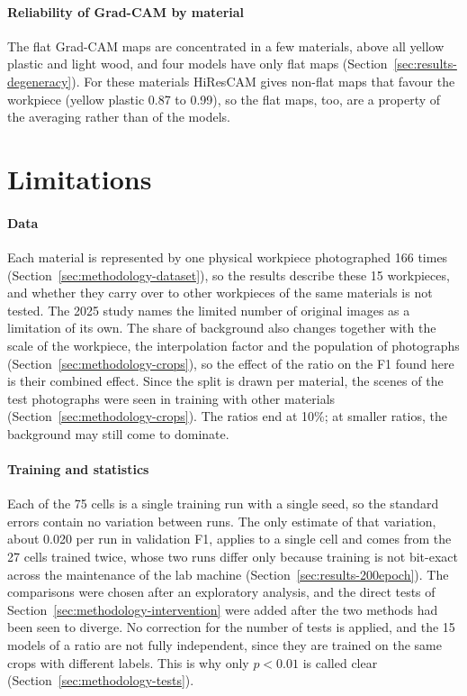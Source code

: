 \paragraph{Reliability of Grad-CAM by material}
The flat Grad-CAM maps are concentrated in a few materials, above all yellow plastic and
light wood, and four models have only flat maps (Section~\ref{sec:results-degeneracy}).
For these materials HiResCAM gives non-flat maps that favour the workpiece (yellow plastic
0.87 to 0.99), so the flat maps, too, are a property of the averaging rather than of the
models.

\section{Limitations}
\label{sec:discussion-limitations}

\paragraph{Data}
Each material is represented by one physical workpiece photographed 166 times
(Section~\ref{sec:methodology-dataset}), so the results describe these 15 workpieces,
and whether they carry over to other workpieces of the same materials is not tested.
The 2025 study names the limited number of original images as a limitation of its own.
The share of background also changes together with the scale of the workpiece, the
interpolation factor and the population of photographs (Section~\ref{sec:methodology-crops}), so the effect of the ratio
on the F1 found here is their combined effect. Since the split is drawn per material, the
scenes of the test photographs were seen in training with other materials (Section~\ref{sec:methodology-crops}). The ratios end at 10\%; at
smaller ratios, the background may still come to dominate.

\paragraph{Training and statistics}
Each of the 75 cells is a single training run with a single seed, so the standard
errors contain no variation between runs. The only estimate of that variation, about
0.020 per run in validation F1, applies to a single cell and comes from the 27 cells
trained twice, whose two runs differ only because training is not bit-exact across the
maintenance of the lab machine (Section~\ref{sec:results-200epoch}). The comparisons were
chosen after an exploratory analysis, and the direct tests of
Section~\ref{sec:methodology-intervention} were added after the two methods had been
seen to diverge. No correction for the number of tests is applied, and the 15 models of
a ratio are not fully independent, since they are trained on the same crops with
different labels. This is why only $p < 0.01$ is called clear
(Section~\ref{sec:methodology-tests}).

